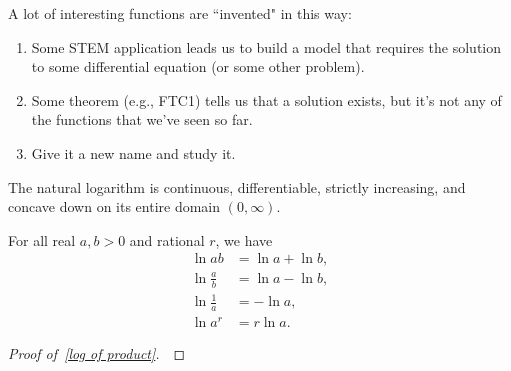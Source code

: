 \begin{remark}
A lot of interesting functions are ``invented" in this way:
\begin{enumerate}
\item Some STEM application leads us to build a model that requires the solution to some differential equation (or some other problem).
\item Some theorem (e.g., FTC1) tells us that a solution exists, but it's not any of the functions that we've seen so far.
\item Give it a new name and study it.
\end{enumerate}
\end{remark}

\newpage 

\begin{corollary}
The natural logarithm is continuous, differentiable, strictly increasing, and concave down on its entire domain $(0,\infty)$.
\end{corollary}


\begin{theorem}
For all real $a,b>0$ and rational $r$, we have
\begin{align}
 \ln ab &= \ln a + \ln b,\label{log of product}\\
 \ln\frac{a}{b} &= \ln a - \ln b,\\
 \ln\frac{1}{a} &= -\ln a,\\
 \ln a^r &= r\ln a.
\end{align}
\end{theorem}
\ifdefined\SOLUTION
{}
\else
\begin{proof}[Proof of~\eqref{log of product}]\,

\vspace{6in}
\end{proof}
\fi

